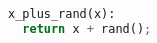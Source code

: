 \begin{lstlisting}[language=Python,style=mystyle]
x_plus_rand(x):
  return x + rand();
 \end{lstlisting}

